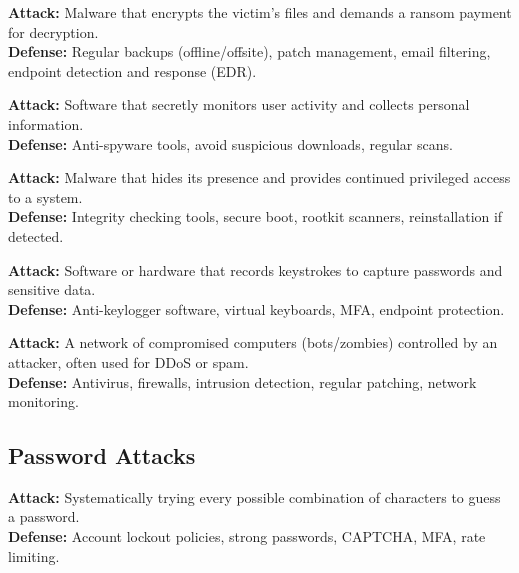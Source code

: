 \documentclass[11pt,a4paper]{article}
\begin{document}
\begin{alertbox}[Ransomware]
\textbf{Attack:} Malware that encrypts the victim's files and demands a ransom payment for decryption.\\
\textbf{Defense:} Regular backups (offline/offsite), patch management, email filtering, endpoint detection and response (EDR).
\end{alertbox}

\begin{alertbox}[Spyware]
\textbf{Attack:} Software that secretly monitors user activity and collects personal information.\\
\textbf{Defense:} Anti-spyware tools, avoid suspicious downloads, regular scans.
\end{alertbox}

\begin{alertbox}[Rootkit]
\textbf{Attack:} Malware that hides its presence and provides continued privileged access to a system.\\
\textbf{Defense:} Integrity checking tools, secure boot, rootkit scanners, reinstallation if detected.
\end{alertbox}

\begin{alertbox}[Keylogger]
\textbf{Attack:} Software or hardware that records keystrokes to capture passwords and sensitive data.\\
\textbf{Defense:} Anti-keylogger software, virtual keyboards, MFA, endpoint protection.
\end{alertbox}

\begin{alertbox}[Botnet]
\textbf{Attack:} A network of compromised computers (bots/zombies) controlled by an attacker, often used for DDoS or spam.\\
\textbf{Defense:} Antivirus, firewalls, intrusion detection, regular patching, network monitoring.
\end{alertbox}

\subsection{Password Attacks}

\begin{alertbox}
\textbf{Attack:} Systematically trying every possible combination of characters to guess a password.\\
\textbf{Defense:} Account lockout policies, strong passwords, CAPTCHA, MFA, rate limiting.
\end{alertbox}
\end{document}

